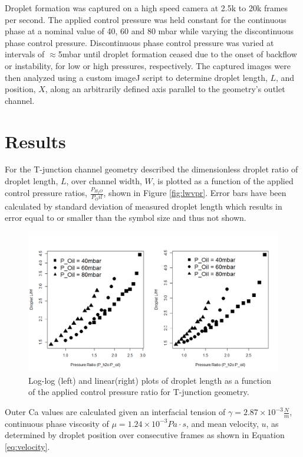 Droplet formation was captured on a high speed camera at 2.5k to 20k frames per second. The applied control pressure was held constant for the continuous phase at a nominal value of 40, 60 and 80 mbar while varying the discontinuous phase control pressure. Discontinuous phase control pressure was varied at intervals of $\approx$5mbar until droplet formation ceased due to the onset of backflow or instability, for low or high pressures, respectively. The captured images were then analyzed using a custom imageJ script to determine droplet length, $L$, and position, $X$, along an arbitrarily defined axis parallel to the geometry's outlet channel.
 
\section{Results}

For the T-junction channel geometry described the dimensionless droplet ratio of droplet length, $L$, over channel width, $W$, is plotted as a function of the applied control pressure ratios, $\frac{P_{H_2O}}{P_Oil}$, shown in Figure \vref{fig:lwvpr}. Error bars have been calculated by standard deviation of measured droplet length which results in error equal to or smaller than the symbol size and thus not shown.

\begin{figure}[H]
\centering 
\includegraphics[width=01.0\columnwidth]{lwvpr.PNG} 
\caption[Droplet Length as a Function of Applied Control Pressure Ratio]{Log-log (left) and linear(right) plots of droplet length as a function of the applied control pressure ratio for T-junction geometry.} 
\label{fig:lwvpr} 
\end{figure}

Outer Ca values are calculated given an interfacial tension of $\gamma = 2.87 \times 10^{-3}\frac{N}{m}$, continuous phase viscosity of $\mu = 1.24 \times 10^{-3} Pa \cdot s$\cite{3M2009}, and mean velocity, $u$, as determined by droplet position over consecutive frames as shown in Equation \vref{eq:velocity}.

